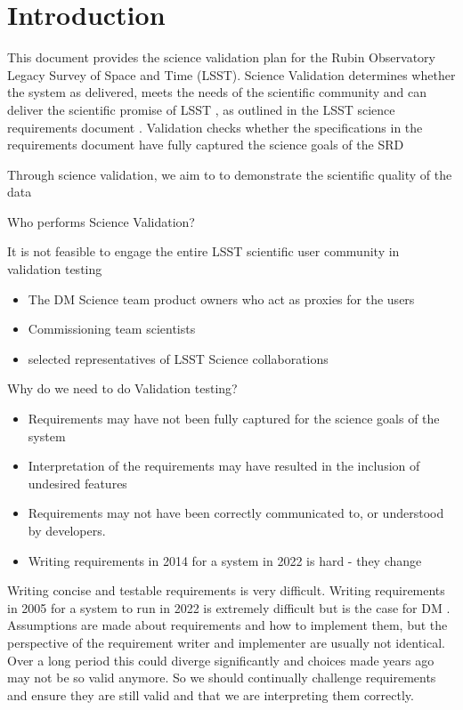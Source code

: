 \section{Introduction}  \label{sec:intro}

This document provides the  science validation plan for the Rubin Observatory Legacy Survey of Space and Time (LSST). 
Science  Validation   determines whether the system as delivered, meets the needs of the scientific community and can deliver the scientific promise of  LSST , as outlined in the  LSST  science requirements document . 
Validation checks whether the specifications in the requirements document have fully captured the science goals of the  SRD  


Through science validation, we aim to to demonstrate the scientific quality of the data 


Who performs Science  Validation?

It is not feasible to engage the entire  LSST  scientific user community in validation testing
\begin{itemize}
\item The  DM  Science team product owners who act as proxies for the users
\item Commissioning   team scientists 
\item selected representatives of  LSST   Science collaborations 
\end{itemize}

Why do we need to do  Validation   testing?
\begin{itemize}
\item Requirements may have not been fully captured for the science goals of the system 
\item Interpretation of the requirements may have resulted in the inclusion of undesired features 
\item Requirements may not have been correctly communicated to, or understood by developers. 
\item Writing requirements in 2014 for a system in 2022 is hard - they change 
\end{itemize}


Writing concise and testable requirements is very difficult. Writing requirements in 2005 for
a system to run in 2022 is extremely difficult but is the case for  DM  . Assumptions are made
about requirements and how to implement them, but the perspective of the requirement
writer and implementer are usually not identical. Over a long period this could diverge significantly and choices made years ago may not be so valid anymore. So we should continually
challenge requirements and ensure they are still valid and that we are interpreting them correctly.

